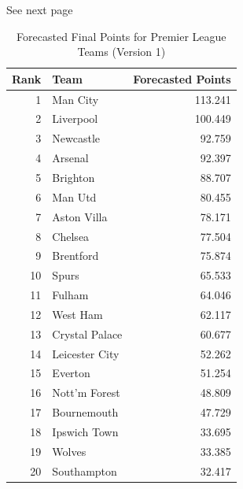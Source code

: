\documentclass{article}
\begin{document}
See next page

\begin{table}[p]
    \centering
    \begin{tabular}{rlr}
    \toprule
    \textbf{Rank} & \textbf{Team} & \textbf{Forecasted Points} \\
    \midrule
    1  & Man City         & 113.241 \\
    2  & Liverpool        & 100.449 \\
    3  & Newcastle        & 92.759  \\
    4  & Arsenal          & 92.397  \\
    5  & Brighton         & 88.707  \\
    6  & Man Utd          & 80.455  \\
    7  & Aston Villa      & 78.171  \\
    8  & Chelsea          & 77.504  \\
    9  & Brentford        & 75.874  \\
    10 & Spurs            & 65.533  \\
    11 & Fulham           & 64.046  \\
    12 & West Ham         & 62.117  \\
    13 & Crystal Palace   & 60.677  \\
    14 & Leicester City   & 52.262  \\
    15 & Everton          & 51.254  \\
    16 & Nott'm Forest    & 48.809  \\
    17 & Bournemouth      & 47.729  \\
    18 & Ipswich Town     & 33.695  \\
    19 & Wolves           & 33.385  \\
    20 & Southampton      & 32.417  \\
    \bottomrule
    \end{tabular}
    \caption{Forecasted Final Points for Premier League Teams (Version 1)}
    \label{tab:forecasted_points_2}
    \vspace{1cm}
\end{table}

\vspace{1cm}
\end{document}
